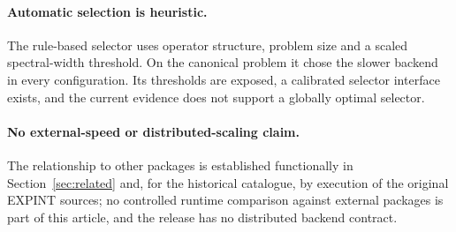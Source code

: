 \paragraph{Automatic selection is heuristic.}
The rule-based selector uses operator structure, problem size and a scaled
spectral-width threshold.  On the canonical problem it chose the slower
backend in every configuration.  Its thresholds are exposed, a calibrated
selector interface exists, and the current evidence does not support a
globally optimal selector.

\paragraph{No external-speed or distributed-scaling claim.}
The relationship to other packages is established functionally in
Section~\ref{sec:related} and, for the historical catalogue, by execution of
the original EXPINT sources; no controlled runtime comparison against external
packages is part of this article, and the release has no distributed backend
contract.
